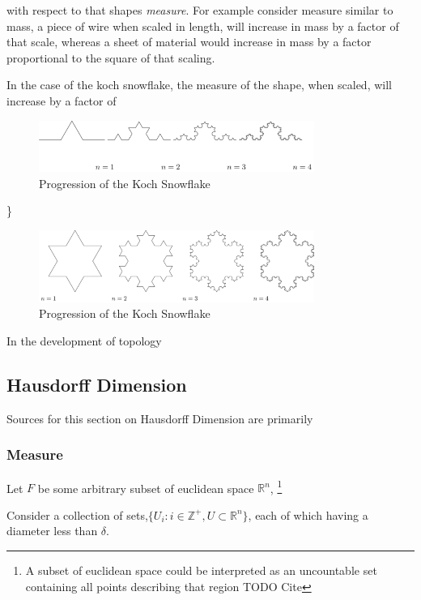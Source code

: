 \documentclass[11pt]{article}
\begin{document}
with respect to that shapes \emph{measure}. For example consider measure similar to mass, a piece
of wire when scaled in length, will increase in mass by a factor of that scale, whereas
a sheet of material would increase in mass by a factor proportional to the square of that scaling.

In the case of the koch snowflake, the measure of the shape, when scaled, will increase by a factor of


\begin{figure}[htbp]
\centering
\includegraphics[width=9cm]{media/tikz/Koch_line.png}
\caption{\label{koch-line}Progression of the Koch Snowflake}
\end{figure}

\}

\begin{figure}[htbp]
\centering
\includegraphics[width=9cm]{media/tikz/Snowflake.png}
\caption{\label{koch-snowflake}Progression of the Koch Snowflake}
\end{figure}






In the development of topology
\subsection{Hausdorff Dimension}
\label{sec:orgd106900}
Sources for this section on Hausdorff Dimension are primarily \cite[Ch. 2]{falconerFractalGeometryMathematical2003}
\subsubsection{Measure}
\label{hausdorff-measure}
Let \(F\) be some arbitrary subset of euclidean space \(\mathbb{R}^n\), \footnote{A subset of euclidean space could be interpreted as an uncountable set containing all points describing that region TODO Cite}

Consider a collection of sets,\(\{U_i: i \in \mathbb{Z}^{+}, U\subset \mathbb{R}^{n}\}\), each of which having a
diameter less than \(\delta\).
\end{document}
